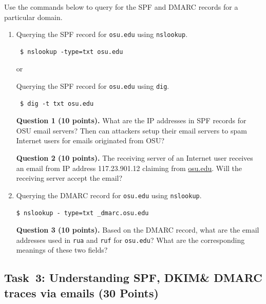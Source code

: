 \documentclass[11pt]{article}
\newcommand{\dmark}{{\sf DMARC}\xspace}
\newcommand{\dkim}{{\sf DKIM}\xspace}
\newcommand{\spf}{{\sf SPF}\xspace}
\begin{document}
Use the commands below to query for the \spf and \dmark records for a particular domain.
\begin{enumerate}
\item Querying the \spf record for \texttt{osu.edu} using \texttt{nslookup}.
 \begin{lstlisting}
 $ nslookup -type=txt osu.edu
\end{lstlisting}\vspace{-6mm}
 or
 
 Querying the \spf record for \texttt{osu.edu} using \texttt{dig}.
 \begin{lstlisting}
 $ dig -t txt osu.edu
\end{lstlisting}\vspace{-6mm}

\textbf{Question 1 (10 points).} What are the IP addresses in \spf records for OSU email servers? Then can attackers setup their email servers to spam Internet users for emails originated from OSU?

\textbf{Question 2 (10 points).} The receiving server of an Internet user receives an email from IP address 117.23.901.12 claiming from \url{osu.edu}. Will the receiving server accept the email?

\item Querying the \dmark record for \texttt{osu.edu} using \texttt{nslookup}.
 \begin{lstlisting}
$ nslookup - type=txt _dmarc.osu.edu
\end{lstlisting}\vspace{-6mm}
 
 \textbf{Question 3 (10 points).} Based on the \dmark record,  what are the email addresses used in \texttt{rua} and \texttt{ruf} for \texttt{osu.edu}?  What are the corresponding meanings of these two fields?
 
\end{enumerate}


\subsection{Task~3: Understanding \spf, \dkim \& \dmark traces via emails (30 Points)}
\end{document}
